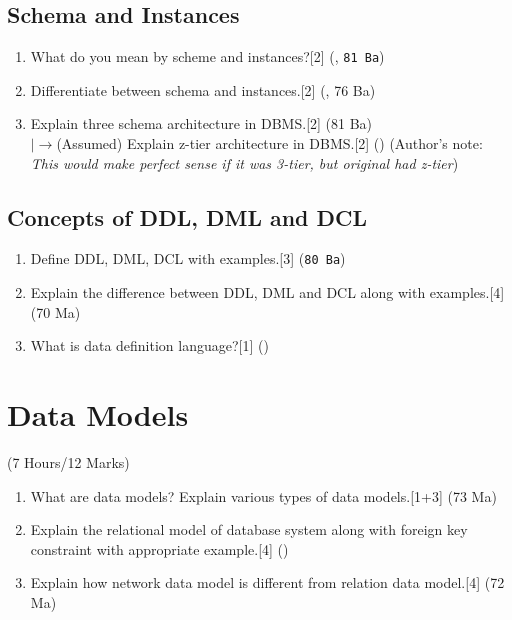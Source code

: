 \documentclass[12pt]{article}
\newcommand{\lb}{\\$\left|\rightarrow\right.$}
\begin{document}
    \subsection{Schema and Instances}
    \begin{enumerate}
    \item What do you mean by scheme and instances?\hfill[2] (, \texttt{81 Ba})
    \item Differentiate between schema and instances.\hfill[2] (, 76 Ba)
    \item Explain three schema architecture in DBMS.\hfill[2] (81 Ba)
    \lb (Assumed) Explain z-tier architecture in DBMS.\hfill[2] ()
    (Author's note: \textit{This would make perfect sense if it was 3-tier, but original had z-tier})
    \end{enumerate}
    
    \subsection{Concepts of DDL, DML and DCL}
    \begin{enumerate}
    \item Define DDL, DML, DCL with examples.\hfill[3] (\texttt{80 Ba})
    \item Explain the difference between DDL, DML and DCL along with examples.\hfill[4] (70 Ma)
    \item What is data definition language?\hfill[1] ()
    \end{enumerate}

    \pagebreak
\section{Data Models}
    \begin{center}(7 Hours/12 Marks)\end{center}
    \begin{enumerate}
    \item What are data models? Explain various types of data models.\hfill[1+3] (73 Ma)

    \item Explain the relational model of database system along with foreign key constraint with appropriate example.\hfill[4] ()

    \item Explain how network data model is different from relation data model.\hfill[4] (72 Ma)
    \end{enumerate}
\end{document}
